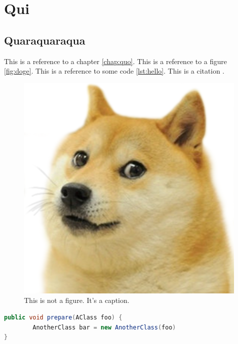 \chapter{Qui}
\label{chap:qui}

\section{Quaraquaraqua}
\label{sec:quaqaraqua}

This is a reference to a chapter \ref{chap:quo}. This is a reference to a figure \ref{fig:doge}. This is a reference to some code \ref{lst:hello}. This is a citation \cite{famous:paper}.

\begin{figure}
\begin{center}
\includegraphics[width=\columnwidth]{images/doge.png}
\end{center}
\caption{This is not a figure. It's a caption.}
\label{fig:foo}
\end{figure}



\begin{lstlisting}[language=Java, label=lst:java, caption={Some code in another language than the default one}]
public void prepare(AClass foo) {
        AnotherClass bar = new AnotherClass(foo)
}
\end{lstlisting}

\Textblind
 